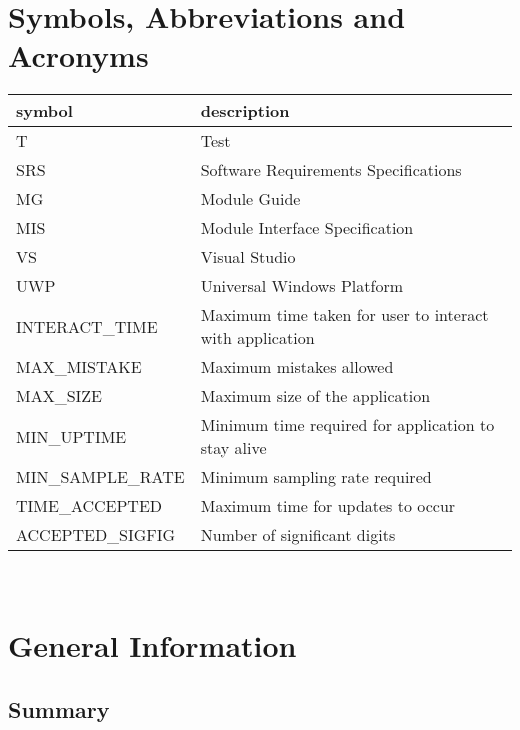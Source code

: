 \documentclass[12pt, titlepage]{article}
\begin{document}
\newpage

\tableofcontents

\listoftables


\newpage

\section{Symbols, Abbreviations and Acronyms}

\renewcommand{\arraystretch}{1.2}
\begin{tabular}{l l} 
  \toprule		
  \textbf{symbol} & \textbf{description}\\
  \midrule 
  T & Test\\
  SRS & Software Requirements Specifications \\
  MG & Module Guide\\
  MIS & Module Interface Specification\\
  VS & Visual Studio\\
  UWP & Universal Windows Platform\\
  INTERACT\_TIME & Maximum time taken for user to interact with application \\
  MAX\_MISTAKE & Maximum mistakes allowed  \\
  MAX\_SIZE & Maximum size of the application \\ 
  MIN\_UPTIME & Minimum time required for application to stay alive  \\ 
  MIN\_SAMPLE\_RATE & Minimum sampling rate required\\
  TIME\_ACCEPTED & Maximum time for updates to occur \\
  ACCEPTED\_SIGFIG & Number of significant digits \\
  \bottomrule
\end{tabular}\\

\newpage


\section{General Information}

\subsection{Summary}
\end{document}
